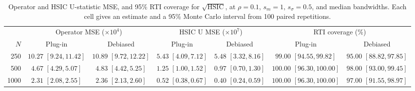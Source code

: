 \begin{table}[htbp]
\centering\small
\caption{Operator and HSIC U-statistic MSE, and 95\% RTI coverage for $\sqrt{\mathrm{HSIC}}$, at $\rho=0.1$, $s_m=1$, $s_\sigma=0.5$, and median bandwidths. Each cell gives an estimate and a 95\% Monte Carlo interval from 100 paired repetitions.}
\label{tab:debiasing-mse-rho0p1}
\setlength{\tabcolsep}{4pt}\renewcommand{\arraystretch}{1.3}
\begin{tabular}{@{}rcccccc@{}}\toprule
& \multicolumn{2}{c}{Operator MSE ($\times 10^{4}$)} & \multicolumn{2}{c}{HSIC U MSE ($\times 10^{7}$)} & \multicolumn{2}{c}{RTI coverage (\%)}\\
\cmidrule(lr){2-3}\cmidrule(lr){4-5}\cmidrule(l){6-7}
$N$ & Plug-in & Debiased & Plug-in & Debiased & Plug-in & Debiased\\\midrule
250 & \shortstack{$10.27$\\{\scriptsize $[9.24,11.42]$}} & \shortstack{$10.89$\\{\scriptsize $[9.72,12.22]$}} & \shortstack{$5.43$\\{\scriptsize $[4.09,7.12]$}} & \shortstack{$5.48$\\{\scriptsize $[3.32,8.16]$}} & \shortstack{$99.00$\\{\scriptsize $[94.55,99.82]$}} & \shortstack{$95.00$\\{\scriptsize $[88.82,97.85]$}}\\[3pt]
500 & \shortstack{$4.67$\\{\scriptsize $[4.29,5.07]$}} & \shortstack{$4.83$\\{\scriptsize $[4.42,5.25]$}} & \shortstack{$1.25$\\{\scriptsize $[1.00,1.52]$}} & \shortstack{$0.97$\\{\scriptsize $[0.70,1.30]$}} & \shortstack{$100.00$\\{\scriptsize $[96.30,100.00]$}} & \shortstack{$98.00$\\{\scriptsize $[93.00,99.45]$}}\\[3pt]
1000 & \shortstack{$2.31$\\{\scriptsize $[2.08,2.55]$}} & \shortstack{$2.36$\\{\scriptsize $[2.13,2.60]$}} & \shortstack{$0.52$\\{\scriptsize $[0.38,0.67]$}} & \shortstack{$0.40$\\{\scriptsize $[0.24,0.59]$}} & \shortstack{$100.00$\\{\scriptsize $[96.30,100.00]$}} & \shortstack{$97.00$\\{\scriptsize $[91.55,98.97]$}}\\[3pt]
\bottomrule\end{tabular}
\end{table}
